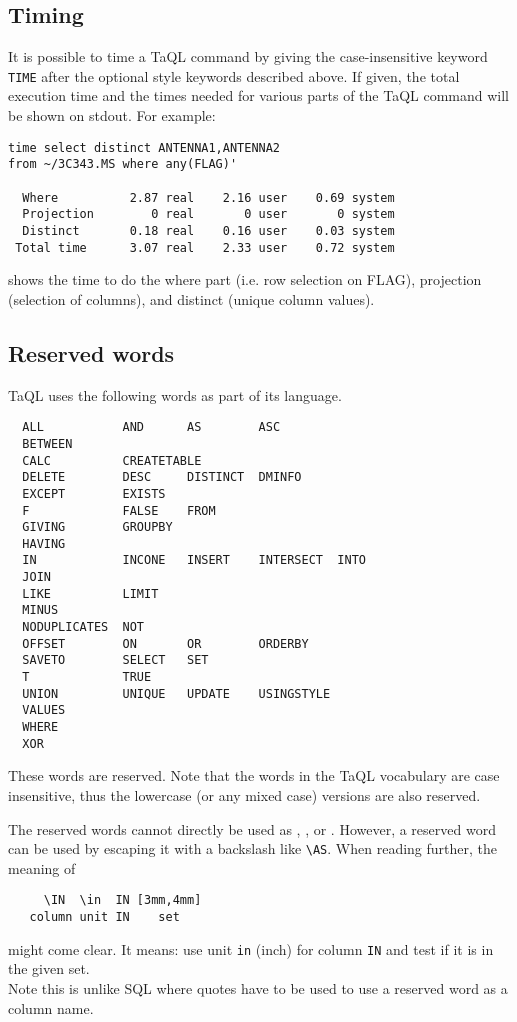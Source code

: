 \subsection{Timing}
It is possible to time a TaQL command by giving the case-insensitive
keyword \texttt{TIME} after the optional style keywords described
above. If given, the total execution time and the times needed for various parts of the
TaQL command will be shown on stdout. For example:
\begin{verbatim}
time select distinct ANTENNA1,ANTENNA2
from ~/3C343.MS where any(FLAG)'

  Where          2.87 real    2.16 user    0.69 system
  Projection        0 real       0 user       0 system
  Distinct       0.18 real    0.16 user    0.03 system
 Total time      3.07 real    2.33 user    0.72 system
\end{verbatim}
shows the time to do the where part (i.e. row selection on FLAG),
projection (selection of columns), and distinct (unique column values).

\subsection{\label{TAQL:RESERVEDWORDS}Reserved words}
TaQL uses the following words as part of its language.
\begin{verbatim}
  ALL           AND      AS        ASC
  BETWEEN 
  CALC          CREATETABLE
  DELETE        DESC     DISTINCT  DMINFO
  EXCEPT        EXISTS
  F             FALSE    FROM
  GIVING        GROUPBY
  HAVING
  IN            INCONE   INSERT    INTERSECT  INTO
  JOIN
  LIKE          LIMIT
  MINUS
  NODUPLICATES  NOT
  OFFSET        ON       OR        ORDERBY
  SAVETO        SELECT   SET
  T             TRUE
  UNION         UNIQUE   UPDATE    USINGSTYLE
  VALUES 
  WHERE
  XOR
\end{verbatim}
These words are reserved. Note that the words in the TaQL vocabulary
are case insensitive, 
thus the lowercase (or any mixed case) versions are also reserved.

The reserved words cannot directly be used as
,
, or 
.
However, a reserved word can be used by escaping it with a backslash like
\verb+\+\texttt{AS}. When reading further, the meaning of
\begin{verbatim}
     \IN  \in  IN [3mm,4mm]
   column unit IN    set
\end{verbatim}
might come clear. It means: use unit \texttt{in} (inch) for column
\texttt{IN} and test if it is in the given set. 
\\Note this is unlike SQL where quotes have to be used to use a
reserved word as a column name.

